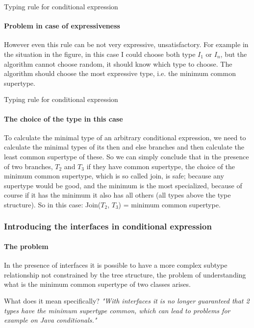 \documentclass{beamer}
\begin{document}
\begin{frame}{Typing rule for conditional expression}
\framesubtitle{Problem in case of expressiveness}
However even this rule can be not very expressive, unsatisfactory.
\newline For example in the situation in the figure, in this case I could choose both type $I_1$ or $I_n$, but the algorithm cannot choose random, it should know which type to choose. \newline
The algorithm should choose the most expressive type, i.e. the minimum common supertype.
\begin{center}
\end{center}
\end{frame}

\begin{frame}{Typing rule for conditional expression}
\framesubtitle{The choice of the type in this case}
To calculate the minimal type of an arbitrary conditional expression, we need to calculate the minimal types of its then and else branches and then calculate the least common supertype of these. \newline
So we can simply conclude that in the presence of two branches, $T_2$ and $T_3$ if they have common supertype, the choice of the minimum common supertype, which is so called join, is safe; because any supertype would be good, and the minimum is the most specialized, because of course if it has the minimum it also has all others (all types above the type structure).    \newline\newline
So in this case: \newline Join($T_2$, $T_3$) = minimum common supertype.
\end{frame}

\begin{frame}
	\frametitle{Introducing the interfaces in conditional expression}
	\framesubtitle{The problem}
	In the presence of interfaces it is possible to have a more complex subtype relationship not constrained by the tree structure, the problem of understanding what is the minimum common supertype of two classes arises.\newline
	\begin{block}{What does it mean specifically?}
		\textit{"With interfaces it is no longer guaranteed that 2 types have the minimum supertype common, which can lead to problems for example on Java conditionals."}
	\end{block}
\end{frame}
\end{document}
